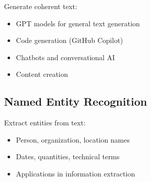 Generate coherent text:
\begin{itemize}
    \item GPT models for general text generation
    \item Code generation (GitHub Copilot)
    \item Chatbots and conversational AI
    \item Content creation
\end{itemize}

\subsection{Named Entity Recognition}

Extract entities from text:
\begin{itemize}
    \item Person, organization, location names
    \item Dates, quantities, technical terms
    \item Applications in information extraction
\end{itemize}

